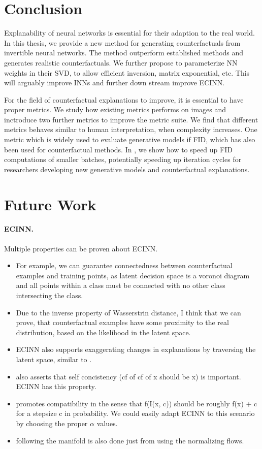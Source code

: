 \documentclass[11pt,a4paper,twoside,openright,final]{memoir}
\begin{document}
\section{Conclusion}
Explanability of neural networks is essential for their adaption to the real world.
In this thesis, we provide a new method for generating counterfactuals from invertible neural networks. 
The method outperform established methods and generates realistic counterfactuals.
We further propose to parameterize NN weights in their SVD, to allow efficient inversion, matrix exponential, etc.
This will arguably improve INNs and further down stream improve ECINN.

For the field of counterfactual explanations to improve, it is essential to have proper metrics.
We study how existing metrics performs on images and inctroduce two further metrics to improve the metric suite.
We find that different metrics behaves similar to human interpretation, when complexity increases.
One metric which is widely used to evaluate generative models if FID, which has also been used for counterfactual methods.
In \cite{fastfid}, we show how to speed up FID computations of smaller batches, potentially speeding up iteration cycles for researchers developing new generative models and counterfactual explanations.

\section{Future Work}
\paragraph{ECINN.}
Multiple properties can be proven about ECINN.
\begin{itemize}
    \item For example, we can guarantee connectedness between counterfactual examples and training points, as latent decision space is a voronoi diagram and all points within a class must be connected with no other class intersecting the class.
    \item Due to the inverse property of Wasserstrin distance, I think that we can prove, that counterfactual examples have some proximity to the real distribution, based on the likelihood in the latent space.
    \item ECINN also supports exaggerating changes in explanations by traversing the latent space, similar to \cite{Singla2019}. 
    \item \cite{Singla2019} also asserts that self concistency (cf of cf of x should be x) is important. ECINN has this property.
    \item \cite{Singla2019} promotes compatibility in the sense that f(I(x, c)) should be roughly f(x) + c for a stepsize c in probability. We could easily adapt ECINN to this scenario by choosing the proper $\alpha$ values.
    \item \cite{Singla2019} following the manifold is also done just from using the normalizing flows.
\end{itemize}
\end{document}
